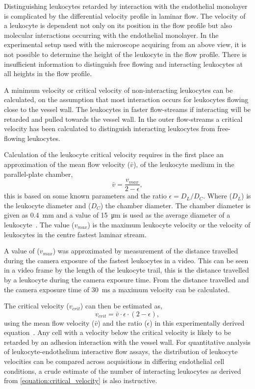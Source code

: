 Distinguishing leukocytes retarded by interaction with the endothelial monolayer is complicated by the differential velocity profile in laminar flow. The velocity of a leukocyte is dependent not only on its position in the flow profile but also molecular interactions occurring with the endothelial monolayer. In the experimental setup used with the microscope acquiring from an above view, it is not possible to determine the height of the leukocyte in the flow profile. There is insufficient information to distinguish free flowing and interacting leukocytes at all heights in the flow profile. 

A minimum velocity or critical velocity of non-interacting leukocytes can be calculated, on the assumption that most interaction occurs for leukocytes flowing close to the vessel wall. The leukocytes in faster flow-streams if interacting will be retarded and pulled towards the vessel wall. In the outer flow-streams a critical velocity has been calculated to distinguish interacting leukocytes from free-flowing leukocytes.

Calculation of the leukocyte critical velocity requires in the first place an approximation of the mean flow velocity ($\bar{v}$), of the leukocyte medium in the parallel-plate chamber,
\begin{equation}
	\bar{v}=\frac{v_{max}}{2-\epsilon},
\end{equation}
this is based on some known parameters and the ratio $\epsilon = D_L/D_C$. Where ($D_L$) is the leukocyte diameter and ($D_C$) the chamber diameter. The chamber diameter is given as \SI{0.4}{\milli\meter} and a value of \SI{15}{\micro\meter} is used as the average diameter of a leukocyte~\cite{Dorgan1998}. The value ($v_{max}$) is the maximum leukocyte velocity or the velocity of leukocytes in the centre fastest laminar stream. 

A value of ($v_{max}$) was approximated by measurement of the distance travelled during the camera exposure of the fastest leukocytes in a video. This can be seen in a video frame by the length of the leukocyte trail, this is the distance travelled by a leukocyte during the camera exposure time. From the distance travelled and the camera exposure time of \SI{30}{\milli\second} a maximum velocity can be calculated.

The critical velocity ($v_{crit}$) can then be estimated as,
\begin{equation}
	v_{crit}=\bar{v}\cdot\epsilon\cdot(2-\epsilon),
\label{equation:critical_velocity}
\end{equation}
using the mean flow velocity ($\bar{v}$) and the ratio ($\epsilon$) in this experimentally derived equation~\cite{Ley1991}. Any cell with a velocity below the critical velocity is likely to be retarded by an adhesion interaction with the vessel wall. For quantitative analysis of leukocyte-endothelium interactive flow assays, the distribution of leukocyte velocities can be compared across acquisitions in differing endothelial cell conditions, a crude estimate of the number of interacting leukocytes as derived from \autoref{equation:critical_velocity} is also instructive.

